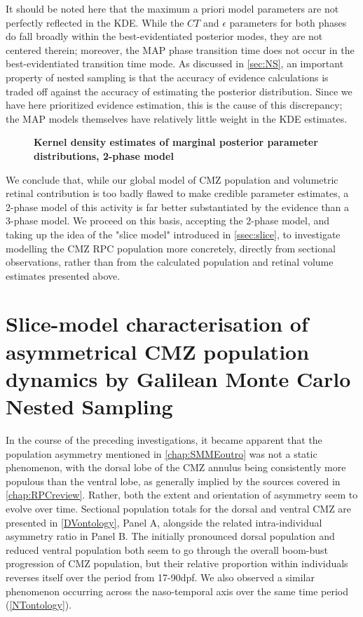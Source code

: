 It should be noted here that the maximum a priori model parameters are not perfectly reflected in the KDE. While the $CT$ and $\epsilon$ parameters for both phases do fall broadly within the best-evidentiated posterior modes, they are not centered therein; moreover, the MAP phase transition time does not occur in the best-evidentiated transition time mode. As discussed in \autoref{sec:NS}, an important property of nested sampling is that the accuracy of evidence calculations is traded off against the accuracy of estimating the posterior distribution. Since we have here prioritized evidence estimation, this is the cause of this discrepancy; the MAP models themselves have relatively little weight in the KDE estimates.

\begin{figure}[!h]
    \caption{{\bf Kernel density estimates of marginal posterior parameter distributions, 2-phase model}}
    \label{phasemarginals}
\end{figure}

We conclude that, while our global model of CMZ population and volumetric retinal contribution is too badly flawed to make credible parameter estimates, a 2-phase model of this activity is far better substantiated by the evidence than a 3-phase model. We proceed on this basis, accepting the 2-phase model, and taking up the idea of the "slice model" introduced in \autoref{ssec:slice}, to investigate modelling the CMZ RPC population more concretely, directly from sectional observations, rather than from the calculated population and retinal volume estimates presented above.

\section{Slice-model characterisation of asymmetrical CMZ population dynamics by Galilean Monte Carlo Nested Sampling}
\label{sec:sliceGMC}

In the course of the preceding investigations, it became apparent that the population asymmetry mentioned in \autoref{chap:SMMEoutro} was not a static phenomenon, with the dorsal lobe of the CMZ annulus being consistently more populous than the ventral lobe, as generally implied by the sources covered in \autoref{chap:RPCreview}. Rather, both the extent and orientation of asymmetry seem to evolve over time. Sectional population totals for the dorsal and ventral CMZ are presented in \autoref{DVontology}, Panel A, alongside the related intra-individual asymmetry ratio in Panel B. The initially pronounced dorsal population and reduced ventral population both seem to go through the overall boom-bust progression of CMZ population, but their relative proportion within individuals reverses itself over the period from 17-90dpf. We also observed a similar phenomenon occurring across the naso-temporal axis over the same time period (\autoref{NTontology}).

